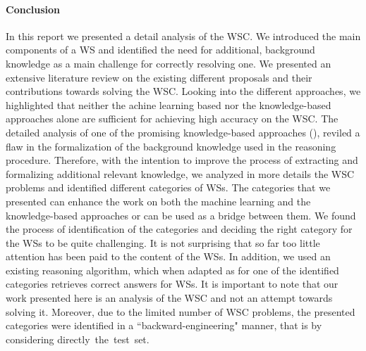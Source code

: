 
\paragraph{Conclusion}
In this report we presented a detail analysis of the WSC. We introduced the main components of a WS and identified the need for additional, background knowledge as a main challenge for correctly resolving one. We presented an extensive literature review on the existing different proposals and their contributions towards solving the WSC. Looking into the different approaches, we highlighted that neither the achine learning based nor the knowledge-based approaches alone are sufficient for achieving high accuracy on the WSC. The detailed analysis of one of the promising knowledge-based approaches (\cite{2018CommonsenseKT}), reviled a flaw in the formalization of the background knowledge used in the reasoning procedure. Therefore, with the intention to improve the process of extracting and formalizing additional relevant knowledge, we analyzed in more details the WSC problems and identified different categories of WSs. The categories that we presented can enhance the work on both the machine learning and the knowledge-based approaches or can be used as a bridge between them. We found the process of identification of the categories and deciding the right category for the WSs to be quite challenging. It is not surprising that so far too little attention has been paid to the content of the WSs. In addition, we used an existing reasoning algorithm, which when adapted as for one of the identified categories retrieves correct answers for WSs. 
It is important to note that our work presented here is an analysis of the WSC and not an attempt towards solving it. Moreover, due to the limited number of WSC problems, the presented categories were identified in a ``backward-engineering" manner, that is by considering directly~the~test~set. 

